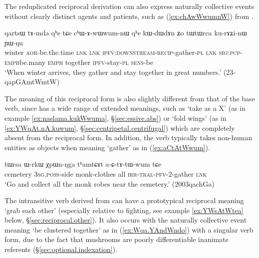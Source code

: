 The reduplicated reciprocal derivation can also express naturally collective events without clearly distinct agents and patients, such as  (\ref{ex:chAwWwumnW}) from .

\begin{exe}
\ex \label{ex:chAwWwumnW}
\gll qartsɯ tɤ-mda qʰe tɕe cʰɯ-ɤ-wɯ\redp{}wum-nɯ qʰe kɯ-dɯ\redp{}dɤn ʑo tɯtɯrca ku-rɤʑi-nɯ ɲɯ-ŋu \\
winter \textsc{aor}-be.the.time \textsc{lnk} \textsc{lnk} \textsc{ipfv}:\textsc{downstream}-\textsc{recip}-gather-\textsc{pl} \textsc{lnk} \textsc{sbj}:\textsc{pcp}-\textsc{emph}\redp{}be.many \textsc{emph} together \textsc{ipfv}-stay-\textsc{pl} \textsc{sens}-be \\
\glt `When winter arrives, they gather and stay together in great numbers.' (23-qapGAmtWmtW) 	
\end{exe}

The meaning of this reciprocal form is also slightly different from that of the base verb, since  has a wide range of extended meanings, such as `take as a X' (as in example \ref{ex:naslama.kukWwuma}, §\ref{sec:essive.abs}) or `fold wings' (as in \ref{ex:YWqAt.nA.kuwum}, §\ref{sec:centripetal.centrifugal}) which are completely absent from the reciprocal form. In addition, the verb   typically takes non-human entities as objects when meaning `gather' as in (\ref{ex:aCtAtWwum}).

\begin{exe}
\ex \label{ex:aCtAtWwum}
\gll tɯrsa ɯ-rkɯ χpɯn-ŋga tʰamtɕɤt a-ɕ-tɤ-tɯ-wum tɕe \\
cemetery \textsc{3sg}.\textsc{poss}-side monk-clothes all \textsc{irr}-\textsc{tral}-\textsc{pfv}-2-gather \textsc{lnk} \\
\glt `Go and collect all the monk robes near the cemetery.' (2003qachGa)
\end{exe}
 
The intransitive verb  derived from  can have a prototypical reciprocal meaning `grab each other' (especially relative to fighting, see example \ref{ex:YWsAtWtea} below, §\ref{sec:reciprocal.other}). It also occurs with the naturally collective event meaning `be clustered together' as in (\ref{ex:Wqa.YAndWndo}) with a singular verb form, due to the fact that mushrooms are poorly differentiable inanimate referents (§\ref{sec:optional.indexation}).

